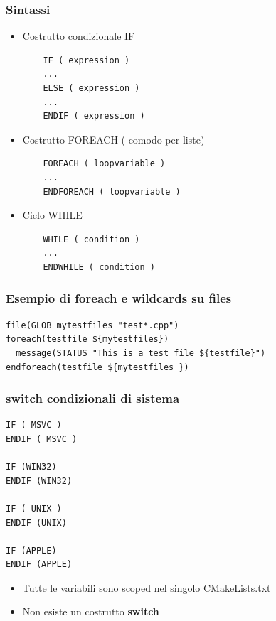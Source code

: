\documentclass[10pt] {beamer}
\begin{document}

\begin{frame}[fragile]
	\frametitle{Sintassi}
\begin{itemize}
 \item Costrutto condizionale IF
	\begin{verbatim}
	IF ( expression )
	...
	ELSE ( expression )
	...
	ENDIF ( expression )
	\end{verbatim}
\item Costrutto FOREACH ( comodo per liste)
	\begin{verbatim}
	FOREACH ( loopvariable )
	...
	ENDFOREACH ( loopvariable )
	\end{verbatim}
\item Ciclo WHILE
	\begin{verbatim}
	WHILE ( condition )
	...
	ENDWHILE ( condition )
	\end{verbatim}
\end{itemize}
\end{frame}


\begin{frame}[fragile]
\frametitle{Esempio di foreach e wildcards su files}
\begin{verbatim}
file(GLOB mytestfiles "test*.cpp")
foreach(testfile ${mytestfiles})
  message(STATUS "This is a test file ${testfile}")
endforeach(testfile ${mytestfiles })
\end{verbatim}
\end{frame}


\begin{frame}[fragile]
\frametitle{switch condizionali di sistema}
\begin{verbatim}
IF ( MSVC )
ENDIF ( MSVC )

IF (WIN32)
ENDIF (WIN32)
 		
IF ( UNIX )
ENDIF (UNIX)
 		
IF (APPLE)
ENDIF (APPLE)
\end{verbatim}
\begin{itemize}
\item Tutte le variabili sono scoped nel singolo CMakeLists.txt
\item Non esiste un costrutto \textbf{switch}
\end{itemize}
\end{frame}
\end{document}
